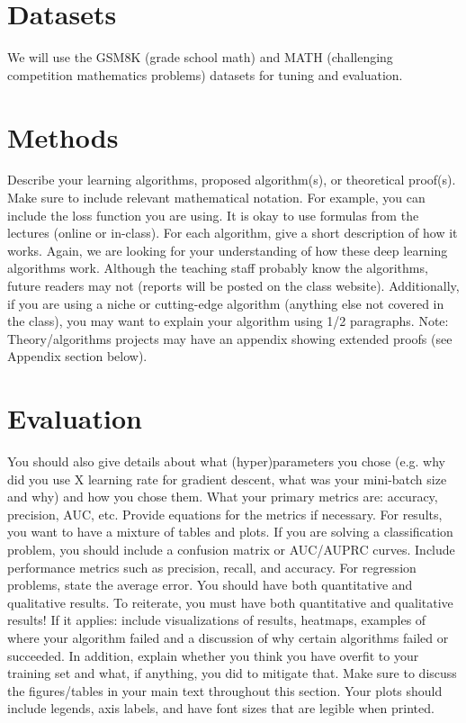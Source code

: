 \documentclass{article}
\begin{document}
\section{Datasets}
We will use the GSM8K (grade school math) and MATH (challenging competition mathematics problems) datasets for tuning and evaluation.



\section{Methods}
Describe your learning algorithms, proposed algorithm(s), or theoretical proof(s). Make
sure to include relevant mathematical notation. For example, you can include the loss function you are using. It is okay to use formulas from the lectures (online or in-class). For each algorithm, give a short description 
of how it works. Again, we are looking for your understanding of how these deep
learning algorithms work. Although the teaching staff probably know the algorithms, future
readers may not (reports will be posted on the class website). Additionally, if you are
using a niche or cutting-edge algorithm (anything else not covered in the class), you may want to explain your algorithm using 1/2
paragraphs. Note: Theory/algorithms projects may have an appendix showing extended
proofs (see Appendix section below).

\section{Evaluation}
You should also give details about what (hyper)parameters you chose (e.g. why did you
use X learning rate for gradient descent, what was your mini-batch size and why) and how
you chose them. What your primary metrics are: accuracy, precision,
AUC, etc. Provide equations for the metrics if necessary. For results, you want to have a
mixture of tables and plots. If you are solving a classification problem, you should include a
confusion matrix or AUC/AUPRC curves. Include performance metrics such as precision,
recall, and accuracy. For regression problems, state the average error. You should have
both quantitative and qualitative results. To reiterate, you must have both quantitative
and qualitative results! If it applies: include visualizations of results, heatmaps,
examples of where your algorithm failed and a discussion of why certain algorithms failed
or succeeded. In addition, explain whether you think you have overfit to your training set
and what, if anything, you did to mitigate that. Make sure to discuss the figures/tables in
your main text throughout this section. Your plots should include legends, axis labels, and
have font sizes that are legible when printed.
\end{document}
